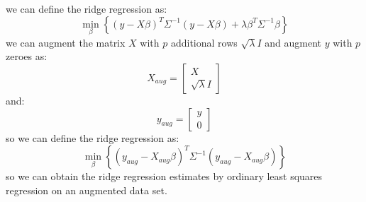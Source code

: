 \begin{qsolve}
	\begin{qsolve}[]
		we can define the ridge regression as:
		$$
		\min_{\beta} \left\{ (y-X\beta)^T \Sigma^{-1} (y-X\beta) + \lambda \beta^T \Sigma^{-1} \beta \right\}
		$$
		we can augment the matrix $X$ with $p$ additional rows $\sqrt{\lambda} I$ and augment $y$ with $p$ zeroes as:
		$$
		X_{aug} =
		\begin{bmatrix}
			X\\
			\sqrt{\lambda} I
		\end{bmatrix}
		$$
		and:
		$$
		y_{aug} =
		\begin{bmatrix}
			y\\
			0
		\end{bmatrix}
		$$
		so we can define the ridge regression as:
		$$
		\min_{\beta} \left\{ (y_{aug}-X_{aug}\beta)^T \Sigma^{-1} (y_{aug}-X_{aug}\beta) \right\}
		$$
		so we can obtain the ridge regression estimates by ordinary least squares regression on an augmented data set.
	\end{qsolve}
\end{qsolve}
